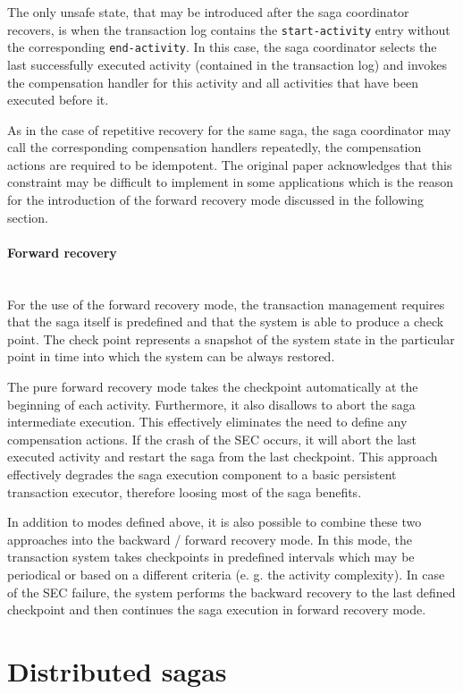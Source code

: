 \documentclass[oneside,
  digital, %
  table,   %
  nolof,     %
  nolot,     %
]{fithesis3}
\newcommand{\newlinepar}[1]{\paragraph{#1}\needspace{4\baselineskip}\mbox{}\\}
\begin{document}
The only unsafe state, that may be introduced after the saga coordinator recovers, is when the transaction log contains the \texttt{start-activity} entry without the corresponding \texttt{end-activity}. In this case, the saga coordinator selects the last successfully executed activity (contained in the transaction log) and invokes the compensation handler for this activity and all activities that have been executed before it.

As in the case of repetitive recovery for the same saga, the saga coordinator may call the corresponding compensation handlers repeatedly, the compensation actions are required to be idempotent. The original paper acknowledges that this constraint may be difficult to implement in some applications which is the reason for the introduction of the forward recovery mode discussed in the following section.

\newlinepar{Forward recovery}

For the use of the forward recovery mode, the transaction management requires that the saga itself is predefined and that the system is able to produce a check point. The check point represents a snapshot of the system state in the particular point in time into which the system can be always restored.

The pure forward recovery mode takes the checkpoint automatically at the beginning of each activity. Furthermore, it also disallows to abort the saga intermediate execution. This effectively eliminates the need to define any compensation actions. If the crash of the SEC occurs, it will abort the last executed activity and restart the saga from the last checkpoint. This approach effectively degrades the saga execution component to a basic persistent transaction executor, therefore loosing most of the saga benefits.

\hfill \break

In addition to modes defined above, it is also possible to combine these two approaches into the backward / forward recovery mode. In this mode, the transaction system takes checkpoints in predefined intervals which may be periodical or based on a different criteria (e. g. the activity complexity). In case of the SEC failure, the system performs the backward recovery to the last defined checkpoint and then continues the saga execution in forward recovery mode.

\section{Distributed sagas}
\end{document}
